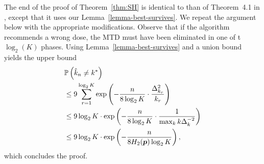 %
%
The end of the proof of Theorem~\ref{thm:SH} is identical to than of Theorem~4.1 in \cite{icml2013_karnin13}, except that it uses our Lemma~\ref{lemma-best-survives}. We repeat the argument below with the appropriate modifications. 
Observe that if the algorithm recommends a wrong dose, the MTD must have been eliminated in one of t $\log_2(K)$ phases. Using Lemma~\ref{lemma-best-survives} and a union bound yields the upper bound
\begin{align*}
&\mathbb{P}\left(\hat{k}_n \neq k^*\right)
\\ &\leq 9 \sum_{r=1}^{\log_2 K} \exp \left(
	- \frac{n}{8 \log_2 K} \cdot \frac{\Delta^2_{k_r}}{k_r}
	\right)	
\\
	&\le 9 \log_2 K \cdot \exp \left(
		- \frac{n}{8 \log_2 K} \cdot \frac{1}{\max_k k \Delta^{-2}_k}
	\right)
\\
	&\le 9 \log_2 K \cdot \exp \left(
		- \frac{n}{8 H_2(\bm p) \log_2 K}
	\right),
\end{align*}
which concludes the proof.


